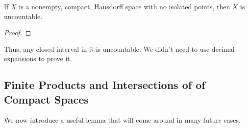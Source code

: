   \begin{theorem}
    If $X$ is a nonempty, compact, Hausdorff space with no isolated points, then $X$ is uncountable. 
  \end{theorem}
  \begin{proof}
    
  \end{proof}

  Thus, any closed interval in $\mathbb{R}$ is uncountable. We didn't need to use decimal expansions to prove it. 

\subsection{Finite Products and Intersections of of Compact Spaces}

  We now introduce a useful lemma that will come around in many future cases. 

